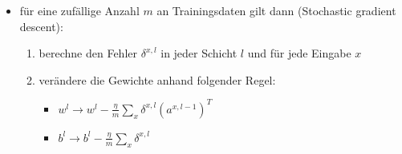 \begin{itemize}
  \item für eine zufällige Anzahl $m$ an Trainingsdaten gilt dann (Stochastic gradient descent):
  \begin{enumerate}
    \item berechne den Fehler $\delta^{x,l}$ in jeder Schicht $l$ und für jede Eingabe $x$
    \item verändere die Gewichte anhand folgender Regel:
    \begin{itemize}
      \item $w^l \rightarrow w^l - \frac{\eta}{m} \sum_x \delta^{x,l}{(a^{x,l-1})}^T$
      \item $b^l \rightarrow b^l - \frac{\eta}{m} \sum_x \delta^{x,l}$ 
    \end{itemize}
  \end{enumerate}
\end{itemize}
